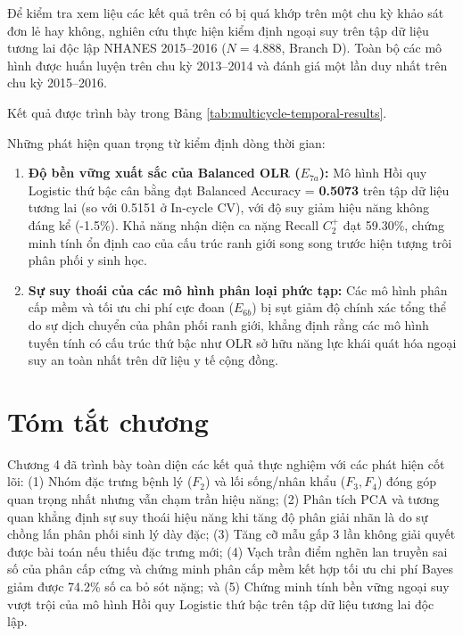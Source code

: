 Để kiểm tra xem liệu các kết quả trên có bị quá khớp trên một chu kỳ khảo sát đơn lẻ hay không, nghiên cứu thực hiện kiểm định ngoại suy trên tập dữ liệu tương lai độc lập NHANES 2015--2016 ($N = 4.888$, Branch D). Toàn bộ các mô hình được huấn luyện trên chu kỳ 2013--2014 và đánh giá một lần duy nhất trên chu kỳ 2015--2016.

Kết quả được trình bày trong Bảng \ref{tab:multicycle-temporal-results}.



Những phát hiện quan trọng từ kiểm định dòng thời gian:
\begin{enumerate}
    \item \textbf{Độ bền vững xuất sắc của Balanced OLR ($E_{7a}$):} Mô hình Hồi quy Logistic thứ bậc cân bằng đạt Balanced Accuracy = \textbf{0.5073} trên tập dữ liệu tương lai (so với 0.5151 ở In-cycle CV), với độ suy giảm hiệu năng không đáng kể (-1.5\%). Khả năng nhận diện ca nặng Recall $C_2^+$ đạt 59.30\%, chứng minh tính ổn định cao của cấu trúc ranh giới song song trước hiện tượng trôi phân phối y sinh học.
    \item \textbf{Sự suy thoái của các mô hình phân loại phức tạp:} Các mô hình phân cấp mềm và tối ưu chi phí cực đoan ($E_{6b}$) bị sụt giảm độ chính xác tổng thể do sự dịch chuyển của phân phối ranh giới, khẳng định rằng các mô hình tuyến tính có cấu trúc thứ bậc như OLR sở hữu năng lực khái quát hóa ngoại suy an toàn nhất trên dữ liệu y tế cộng đồng.
\end{enumerate}

\section{Tóm tắt chương}
\label{sec:tom-tat-chuong-4}

Chương 4 đã trình bày toàn diện các kết quả thực nghiệm với các phát hiện cốt lõi: (1) Nhóm đặc trưng bệnh lý ($F_2$) và lối sống/nhân khẩu ($F_3, F_4$) đóng góp quan trọng nhất nhưng vẫn chạm trần hiệu năng; (2) Phân tích PCA và tương quan khẳng định sự suy thoái hiệu năng khi tăng độ phân giải nhãn là do sự chồng lấn phân phối sinh lý dày đặc; (3) Tăng cỡ mẫu gấp 3 lần không giải quyết được bài toán nếu thiếu đặc trưng mới; (4) Vạch trần điểm nghẽn lan truyền sai số của phân cấp cứng và chứng minh phân cấp mềm kết hợp tối ưu chi phí Bayes giảm được 74.2\% số ca bỏ sót nặng; và (5) Chứng minh tính bền vững ngoại suy vượt trội của mô hình Hồi quy Logistic thứ bậc trên tập dữ liệu tương lai độc lập.
